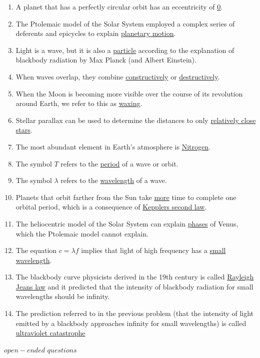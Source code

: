 \documentclass[12pt]{article}
\begin{document}
\begin{enumerate}
        \item A planet that has a perfectly circular orbit has an eccentricity of \underline{0}.
        \item The Ptolemaic model of the Solar System employed a complex series of  deferents and epicycles to explain \underline{planetary motion}.
        \item Light is a wave, but it is also a \underline{particle} according to the explanation of blackbody radiation by Max Planck (and Albert Einstein).
        \item When waves overlap, they combine \underline{constructively} or \underline{destructively}.
        \item When the Moon is becoming more visible over the course of its revolution around Earth, we refer to this as \underline{waxing}.
        \item Stellar parallax can be used to determine the distances to only \underline{relatively close stars}.
        \item The most abundant element in Earth’s atmosphere is \underline{Nitrogen}.
        \item The symbol $T$ refers to the \underline {period} of a wave or orbit.
        \item The symbol $\lambda$ refers to the \underline{wavelength} of a wave.
        \item Planets that orbit farther from the Sun take \underline{more} time to complete one orbital period, which is a consequence of \underline{Kepplers second law}.
        \item The heliocentric model of the Solar System can explain \underline{phases} of Venus, which the Ptolemaic model cannot explain.
        \item The equation $c = \lambda f$ implies that light of high frequency has a \underline{small wavelength}.
        \item The blackbody curve physicists derived in the 19th century is called \underline{Rayleigh Jeans law} and it predicted that the intensity of blackbody radiation for small wavelengths should be infinity.
        \item The prediction referred to in the previous problem (that the intensity of light emitted by a blackbody approaches infinity for small wavelengths) is called \underline{ultraviolet catastrophe}

\end{enumerate}
$open-ended$ $questions$
\end{document}
